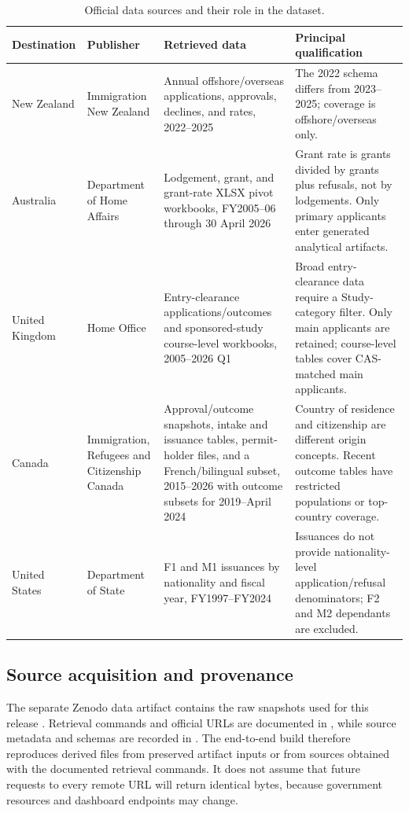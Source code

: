 \documentclass[runningheads]{llncs}
\newcommand{\file}[1]{\path{#1}}
\begin{document}
\begin{table}[htbp]
\centering
\caption{Official data sources and their role in the dataset.}
\label{tab:sources}
\small
\begin{tabularx}{\textwidth}{@{}L{2.1cm}L{3.0cm}Y Y@{}}
\toprule
Destination & Publisher & Retrieved data & Principal qualification \\
\midrule
New Zealand & Immigration New Zealand \cite{inz} & Annual offshore/overseas applications, approvals, declines, and rates, 2022--2025 & The 2022 schema differs from 2023--2025; coverage is offshore/overseas only. \\
Australia & Department of Home Affairs \cite{australia} & Lodgement, grant, and grant-rate XLSX pivot workbooks, FY2005--06 through 30 April 2026 & Grant rate is grants divided by grants plus refusals, not by lodgements. Only primary applicants enter generated analytical artifacts. \\
United Kingdom & Home Office \cite{uk} & Entry-clearance applications/outcomes and sponsored-study course-level workbooks, 2005--2026 Q1 & Broad entry-clearance data require a Study-category filter. Only main applicants are retained; course-level tables cover CAS-matched main applicants. \\
Canada & Immigration, Refugees and Citizenship Canada \cite{canada} & Approval/outcome snapshots, intake and issuance tables, permit-holder files, and a French/bilingual subset, 2015--2026 with outcome subsets for 2019--April 2024 & Country of residence and citizenship are different origin concepts. Recent outcome tables have restricted populations or top-country coverage. \\
United States & Department of State \cite{us} & F1 and M1 issuances by nationality and fiscal year, FY1997--FY2024 & Issuances do not provide nationality-level application/refusal denominators; F2 and M2 dependants are excluded. \\
\bottomrule
\end{tabularx}
\end{table}

\subsection{Source acquisition and provenance}

The separate Zenodo data artifact contains the raw snapshots used for this release \cite{dataset}. Retrieval commands and official URLs are documented in \file{data/RETRIEVAL.md}, while source metadata and schemas are recorded in \file{data/country-schema.json}. The end-to-end build therefore reproduces derived files from preserved artifact inputs or from sources obtained with the documented retrieval commands. It does not assume that future requests to every remote URL will return identical bytes, because government resources and dashboard endpoints may change.
\end{document}
